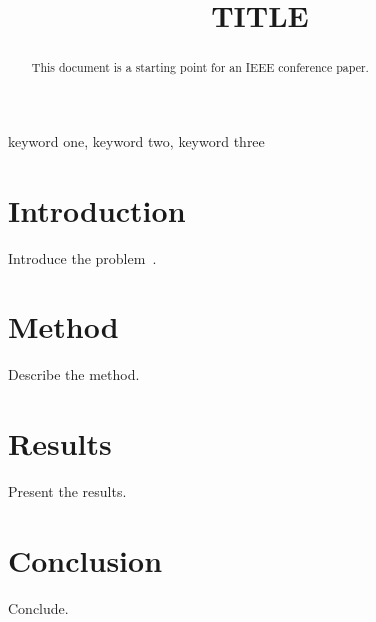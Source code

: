 \documentclass[conference]{IEEEtran}
\begin{document}
\title{{{TITLE}}}

\author{
}

\maketitle

\begin{abstract}
This document is a starting point for an IEEE conference paper.
\end{abstract}

\begin{IEEEkeywords}
keyword one, keyword two, keyword three
\end{IEEEkeywords}

\section{Introduction}
Introduce the problem~\cite{knuth1984}.

\section{Method}
Describe the method.

\section{Results}
Present the results.

\section{Conclusion}
Conclude.



\end{document}
